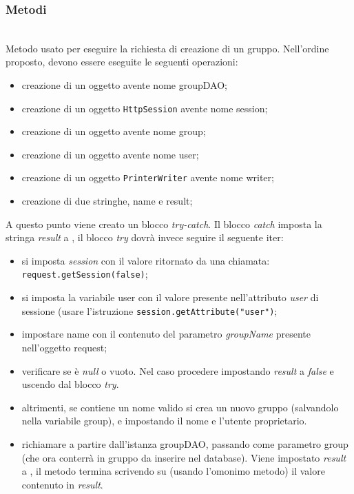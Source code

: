 \subsubsection*{Metodi}
\begin{description}
	\item{}\\	
	Metodo usato per eseguire la richiesta di creazione di un gruppo. Nell'ordine proposto, devono essere eseguite le seguenti operazioni:
	\begin{itemize}
		\item creazione di un oggetto  avente nome groupDAO;
		\item creazione di un oggetto \texttt{HttpSession} avente nome session;
		\item creazione di un oggetto  avente nome group;
		\item creazione di un oggetto  avente nome user;
		\item creazione di un oggetto \texttt{PrinterWriter} avente nome writer;
		\item creazione di due stringhe, name e result;
	\end{itemize}
	A questo punto viene creato un blocco \textit{try-catch}. Il blocco \textit{catch} imposta la stringa \textit{result} a , il blocco \textit{try} dovrà invece seguire il seguente iter:
	\begin{itemize}
		\item si imposta \textit{session} con il valore ritornato da una chiamata:\\
		\verb|request.getSession(false)|;
		\item si imposta la variabile user con il valore presente nell'attributo \textit{user} di sessione (usare l'istruzione \verb|session.getAttribute("user")|;
		\item impostare name con il contenuto del parametro \textit{groupName} presente nell'oggetto request;
		\item verificare se  è \textit{null} o vuoto. Nel caso procedere impostando \textit{result} a \textit{false} e uscendo dal blocco \textit{try}.
		\item altrimenti, se  contiene un nome valido si crea un nuovo gruppo (salvandolo nella variabile group), e impostando il nome e l'utente proprietario.
		\item richiamare  a partire dall'istanza groupDAO, passando come parametro group (che ora conterrà in gruppo da inserire nel database). Viene impostato \textit{result} a ,
	il metodo termina scrivendo su  (usando l'omonimo metodo) il valore contenuto in \textit{result}. 		
	\end{itemize}
	
\end{description}

